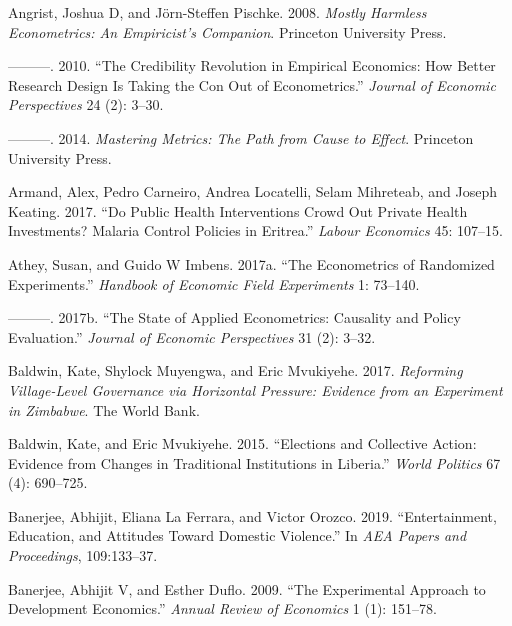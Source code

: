 \documentclass[
]{book}
\begin{document}
\leavevmode\hypertarget{ref-angrist2008mostly}{}%
Angrist, Joshua D, and Jörn-Steffen Pischke. 2008. \emph{Mostly Harmless Econometrics: An Empiricist's Companion}. Princeton University Press.

\leavevmode\hypertarget{ref-angrist2010credibility}{}%
---------. 2010. ``The Credibility Revolution in Empirical Economics: How Better Research Design Is Taking the Con Out of Econometrics.'' \emph{Journal of Economic Perspectives} 24 (2): 3--30.

\leavevmode\hypertarget{ref-angrist2014mastering}{}%
---------. 2014. \emph{Mastering Metrics: The Path from Cause to Effect}. Princeton University Press.

\leavevmode\hypertarget{ref-armand2017public}{}%
Armand, Alex, Pedro Carneiro, Andrea Locatelli, Selam Mihreteab, and Joseph Keating. 2017. ``Do Public Health Interventions Crowd Out Private Health Investments? Malaria Control Policies in Eritrea.'' \emph{Labour Economics} 45: 107--15.

\leavevmode\hypertarget{ref-athey2017econometrics}{}%
Athey, Susan, and Guido W Imbens. 2017a. ``The Econometrics of Randomized Experiments.'' \emph{Handbook of Economic Field Experiments} 1: 73--140.

\leavevmode\hypertarget{ref-athey2017state}{}%
---------. 2017b. ``The State of Applied Econometrics: Causality and Policy Evaluation.'' \emph{Journal of Economic Perspectives} 31 (2): 3--32.

\leavevmode\hypertarget{ref-baldwin2017reforming}{}%
Baldwin, Kate, Shylock Muyengwa, and Eric Mvukiyehe. 2017. \emph{Reforming Village-Level Governance via Horizontal Pressure: Evidence from an Experiment in Zimbabwe}. The World Bank.

\leavevmode\hypertarget{ref-baldwin2015elections}{}%
Baldwin, Kate, and Eric Mvukiyehe. 2015. ``Elections and Collective Action: Evidence from Changes in Traditional Institutions in Liberia.'' \emph{World Politics} 67 (4): 690--725.

\leavevmode\hypertarget{ref-banerjee2019entertainment}{}%
Banerjee, Abhijit, Eliana La Ferrara, and Victor Orozco. 2019. ``Entertainment, Education, and Attitudes Toward Domestic Violence.'' In \emph{AEA Papers and Proceedings}, 109:133--37.

\leavevmode\hypertarget{ref-banerjee2009experimental}{}%
Banerjee, Abhijit V, and Esther Duflo. 2009. ``The Experimental Approach to Development Economics.'' \emph{Annual Review of Economics} 1 (1): 151--78.
\end{document}
